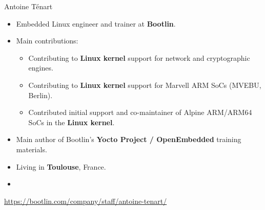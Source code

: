 \begin{frame}{Antoine Ténart}
  \begin{itemize}
    \item Embedded Linux engineer and trainer at {\bf Bootlin}.
    \item Main contributions:
    \begin{itemize}
      \item Contributing to {\bf Linux kernel} support for network and
        cryptographic engines.
      \item Contributing to {\bf Linux kernel} support for Marvell ARM
        SoCs (MVEBU, Berlin).
      \item Contributed initial support and co-maintainer of Alpine
        ARM/ARM64 SoCs in the {\bf Linux kernel}.
    \end{itemize}
    \item Main author of Bootlin's {\bf Yocto Project / OpenEmbedded}
      training materials.
    \item Living in {\bf Toulouse}, France.
    \item {}
  \end{itemize}
  {\small \url{https://bootlin.com/company/staff/antoine-tenart/}}
\end{frame}
